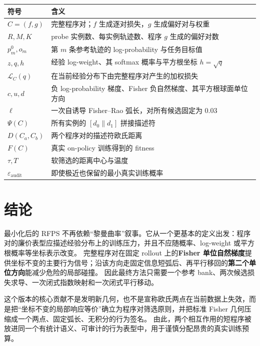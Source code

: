 \documentclass[UTF8,11pt]{ctexart}
\newcommand{\concat}{\mathbin{\|}}
\begin{document}
\begin{table}[h]
\centering
\small
\begin{tabularx}{\textwidth}{p{}X}
\toprule
\textbf{符号} & \textbf{含义}\\
\midrule
$C=(f,g)$ & 完整程序对；$f$ 生成逐对损失，$g$ 生成偏好对与权重\\
$R,M,K$ & probe 实例数、每实例轨迹数、程序 $g$ 生成的偏好对数\\
$p_m^0,o_m$ & 第 $m$ 条参考轨迹的 log-probability 与任务目标值\\
$z,q,h$ & 经验 log-weight、其 softmax 概率与平方根坐标 $h=\sqrt q$\\
$\mathcal L_C(q)$ & 在当前经验分布下由完整程序对产生的加权损失\\
$c,u,d$ & 负 log-probability 梯度、Fisher 负自然梯度、其平方根球面单位方向\\
$\ell$ & 一次自诱导 Fisher--Rao 弧长，对所有候选固定为 $0.03$\\
$\Psi(C)$ & 所有实例的 $[d_0\concat d_1]$ 拼接描述符\\
$D(C_a,C_b)$ & 两个程序对的描述符欧氏距离\\
$F(C)$ & 真实 on-policy 训练得到的 fitness\\
$\tau,T$ & 软筛选的距离中心与温度\\
$\varepsilon_{\mathrm{audit}}$ & 即使极近也保留的最小真实训练概率\\
\bottomrule
\end{tabularx}
\end{table}

\section{结论}

最小化后的 RFPS 不再依赖“黎曼曲率”叙事。它从一个更基本的定义出发：程序对的廉价表型应描述经验分布上的训练压力，并且不应随概率、log-weight 或平方根概率等坐标表示改变。
完整程序对在固定 rollout 上的\textbf{Fisher 单位自然梯度}提供坐标不变的主要行为信号；沿该方向走固定信息短弧后、再平行移回的\textbf{第二个单位方向}能减少危险的局部碰撞。
因此最终方法只需要一个参考 bank、两次候选损失求导、一次闭式指数映射和一次闭式平行移动。

这个版本的核心贡献不是发明新几何，也不是宣称欧氏两点在当前数据上失效，而是把“坐标不变的局部响应等价”确立为程序对筛选原则，并把标准 Fisher 几何压缩成一个两点、固定弧长、无积分的行为签名。
由此，两个相互作用的短程序被放进同一个有统计语义、可审计的行为表型中，用于谨慎分配昂贵的真实训练预算。



\end{document}
